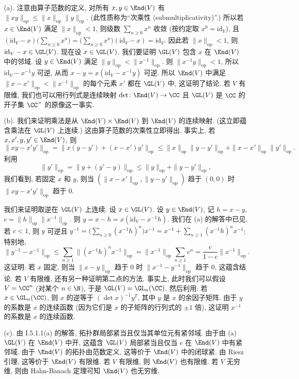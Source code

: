 \begin{solution}
(a). 注意由算子范数的定义, 对所有 $x, y \in \End(V)$ 有 $\|xy\|_{\mathrm{op}} \leq \|x\|_{\mathrm{op}}\|y\|_{\mathrm{op}}$. (此性质称为``次乘性 (submultiplicativity)''.) 所以若 $x \in \End(V)$ 满足 $\|x\|_{\mathrm{op}} < 1$, 则级数 $\sum_{n \geq 0}x^n$ 收敛 (按约定取 $x^0 = \mathrm{id}_V$), 且 $(\mathrm{id}_V - x)\bigl(\sum_{n \geq 0}x^n\bigr) = \bigl(\sum_{n \geq 0}x^n\bigr)(\mathrm{id}_V - x) = \mathrm{id}_V$. 因此若 $\|x\|_{\mathrm{op}} < 1$, 则 $\mathrm{id}_V - x \in \GL(V)$.
现在设 $x \in \GL(V)$. 我们要证明 $\GL(V)$ 包含 $x$ 在 $\End(V)$ 中的邻域. 设 $y \in \End(V)$ 满足 $\|y\|_{\mathrm{op}} < \|x^{-1}\|_{\mathrm{op}}$. 则 $\|x^{-1}y\|_{\mathrm{op}} < 1$, 所以 $\mathrm{id}_V - x^{-1}y$ 可逆, 从而 $x - y = x(\mathrm{id}_V - x^{-1}y)$ 可逆. 所以 $\End(V)$ 中满足 $\|x - x'\|_{\mathrm{op}} < \|x^{-1}\|_{\mathrm{op}}$ 的每个元素 $x'$ 都在 $\GL(V)$ 中, 这证明了结论.
若 $V$ 有限维, 我们也可以用行列式是连续映射 $\det \colon \End(V) \to \CC$ 且 $\GL(V)$ 是 $\CC$ 的开子集 $\CC^{\times}$ 的原像这一事实.

(b). 我们来证明乘法是从 $\End(V) \times \End(V)$ 到 $\End(V)$ 的连续映射. (这立即蕴含乘法在 $\GL(V)$ 上连续.) 这由算子范数的次乘性立即得出. 事实上, 若 $x, x', y, y' \in \End(V)$, 则
\[
\|xy - x'y'\|_{\mathrm{op}} = \|x(y - y') + (x - x')y'\|_{\mathrm{op}} \leq \|x\|_{\mathrm{op}}\|y - y'\|_{\mathrm{op}} + \|x - x'\|_{\mathrm{op}}\|y'\|_{\mathrm{op}}.
\]
利用
\[
\|y'\|_{\mathrm{op}} = \|y + (y' - y)\|_{\mathrm{op}} \leq \|y\|_{\mathrm{op}} + \|y - y'\|_{\mathrm{op}},
\]
我们看到, 若固定 $x$ 和 $y$, 则当 $(\|x - x'\|_{\mathrm{op}}, \|y - y'\|_{\mathrm{op}})$ 趋于 $(0,0)$ 时 $\|xy - x'y'\|_{\mathrm{op}}$ 趋于 $0$.

我们来证明取逆在 $\GL(V)$ 上连续. 设 $x \in \GL(V)$. 设 $y \in \End(V)$, 记 $h = x - y$, $c = \|h\|_{\mathrm{op}}\|x^{-1}\|_{\mathrm{op}}$. 则 $y = x - h = x(\mathrm{id}_V - x^{-1}h)$. 我们在 (a) 的解答中已见, 若 $c < 1$, 则 $y$ 可逆且 $y^{-1} = \bigl(\sum_{n \geq 0}(x^{-1}h)^n\bigr)x^{-1} = x^{-1} + \sum_{n \geq 1}(x^{-1}h)^nx^{-1}$; 特别地,
\[
\|y^{-1} - x^{-1}\|_{\mathrm{op}} \leq \sum_{n \geq 1}\|(x^{-1}h)^nx^{-1}\|_{\mathrm{op}} = \|x^{-1}\|_{\mathrm{op}}\sum_{n \geq 1}c^n = \frac{c}{1-c}\|x^{-1}\|_{\mathrm{op}}.
\]
这证明: 若 $x$ 固定, 则当 $\|x - y\|_{\mathrm{op}}$ 趋于 $0$ 时 $\|x^{-1} - y^{-1}\|_{\mathrm{op}}$ 趋于 $0$, 这蕴含结论.
若 $V$ 有限维, 还有另一种证明第二点的方法. 事实上, 此时我们可以假设 $V = \CC^n$ (对某个 $n \in \N$), 于是 $\GL(V) = \GL_n(\CC)$. 然后利用: 若 $x \in \GL_n(\CC)$, 则 $x$ 的逆等于 $(\det x)^{-1}y^T$, 其中 $y$ 是 $x$ 的余因子矩阵. 由于 $y$ 的系数是 $x$ 的连续函数 (因为它们是 $x$ 的子矩阵的行列式的 $\pm 1$ 倍), 这证明 $x^{-1}$ 的系数是 $x$ 的连续函数.

(c). 由 I.5.1.1(a) 的解答, 拓扑群局部紧当且仅当其单位元有紧邻域. 由于由 (a) $\GL(V)$ 在 $\End(V)$ 中开, 这蕴含 $\GL(V)$ 局部紧当且仅当 $e$ 在 $\End(V)$ 中有紧邻域. 由于 $\End(V)$ 的拓扑由范数定义, 这等价于 $\End(V)$ 中的闭球紧. 由 Riesz 引理, 这等价于 $\End(V)$ 有限维. 若 $V$ 有限维, 则 $\End(V)$ 也有限维. 若 $V$ 无穷维, 则由 Hahn-Banach 定理可知 $\End(V)$ 也无穷维.
\end{solution}

